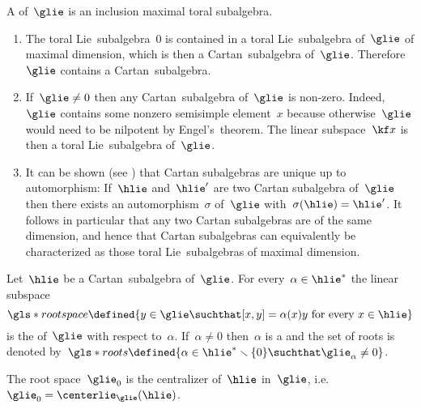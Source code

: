 \begin{definition}
  A  of~$\glie$ is an inclusion maximal toral subalgebra.
\end{definition}


\begin{remark}
  \leavevmode
  \begin{enumerate}
    \item
      The toral Lie~subalgebra~$0$ is contained in a toral Lie~subalgebra of~$\glie$ of maximal dimension, which is then a Cartan~subalgebra of~$\glie$.
      Therefore~$\glie$ contains a Cartan~subalgebra.
    \item
      If~$\glie \neq 0$ then any Cartan~subalgebra of~$\glie$ is non-zero.
      Indeed,~$\glie$ contains some nonzero semisimple element~$x$ because otherwise~$\glie$ would need to be nilpotent by Engel’s~theorem.
      The linear subspace~$\kf x$ is then a toral Lie~subalgebra of~$\glie$.
    \item
      It can be shown (see \cite[\S 16.2]{humphreys}) that Cartan subalgebras are unique up to automorphism:
      If~$\hlie$ and~$\hlie'$ are two Cartan subalgebra of~$\glie$ then there exists an automorphism~$\sigma$ of~$\glie$ with~$\sigma(\hlie) = \hlie'$.
      It follows in particular that any two Cartan subalgebras are of the same dimension, and hence that Cartan subalgebras can equivalently be characterized as those toral Lie~subalgebras of maximal dimension.
  \end{enumerate}
\end{remark}


\begin{definition}
  Let~$\hlie$ be a Cartan~subalgebra of~$\glie$.
  For every~$\alpha \in \hlie^*$ the linear subspace
  \[
    \gls*{root space}
    \defined
    \{
      y \in \glie
    \suchthat
      \text{$[x,y] = \alpha(x)y$ for every~$x \in \hlie$}
    \}
  \]
  is the  of~$\glie$ with respect to~$\alpha$.
  If~$\alpha \neq 0$ then~$\alpha$ is a  and the set of roots is denoted by~$\gls*{roots} \defined \{\alpha \in \hlie^* \smallsetminus \{0\} \suchthat \glie_\alpha \neq 0\}$.
\end{definition}


\begin{remark}
  The root space~$\glie_0$ is the centralizer of~$\hlie$ in~$\glie$, i.e.~$\glie_0 = \centerlie_{\glie}(\hlie)$.
\end{remark}


